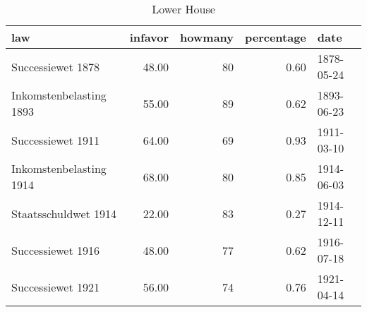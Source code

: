 \begin{table}[ht]
\centering
\begin{tabular}{lrrrl}
  \hline
law & infavor & howmany & percentage & date \\ 
  \hline
Successiewet 1878 & 48.00 &  80 & 0.60 & 1878-05-24 \\ 
  Inkomstenbelasting 1893 & 55.00 &  89 & 0.62 & 1893-06-23 \\ 
  Successiewet 1911 & 64.00 &  69 & 0.93 & 1911-03-10 \\ 
  Inkomstenbelasting 1914 & 68.00 &  80 & 0.85 & 1914-06-03 \\ 
  Staatsschuldwet 1914 & 22.00 &  83 & 0.27 & 1914-12-11 \\ 
  Successiewet 1916 & 48.00 &  77 & 0.62 & 1916-07-18 \\ 
  Successiewet 1921 & 56.00 &  74 & 0.76 & 1921-04-14 \\ 
   \hline
\end{tabular}
\caption{Lower House} 
\end{table}
